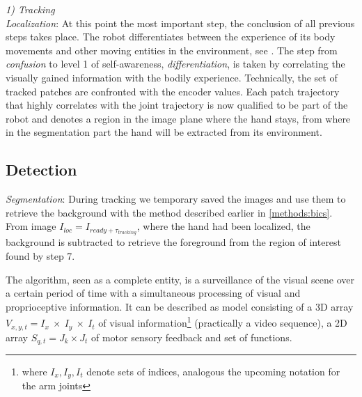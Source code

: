 	
	
%
\textit{1) Tracking}\\ \newline
\textit{Localization}: At this point the most important step, the conclusion of all previous steps takes place. The 						robot differentiates between the experience of its body movements and other moving entities in the environment, see 				\cite{FLSAUEL03-02}. The step from \textit{confusion} to level 1 of self-awareness, \textit{differentiation}, is 							taken by correlating the visually gained information with the bodily experience. Technically, the set of tracked  						patches are confronted with the encoder values. Each patch trajectory that highly correlates with the joint 									trajectory is now qualified to be part of the robot and denotes a region in the image plane where the hand stays, from where in the segmentation part the hand will be extracted from its environment.
\\ \newline
%
%
%
%
\subsection{Detection}\label{method:detection}
\textit{Segmentation}: During tracking we temporary saved the images and use them to retrieve the background with the method described earlier in \ref{methods:bics}. From image $I_{loc}=I_{ready + \tau_{tracking}}$, where the hand had been localized, the background  is subtracted to retrieve the foreground from the region of interest found by step 7.

%
The algorithm, seen as a complete entity, is a surveillance of the visual scene over a certain period of time with a simultaneous processing of visual and proprioceptive information. It can be described as model consisting of a 3D array $V_{x,y,t}=I_x\ \times\ I_y\ \times\ I_t$ of visual information\footnote{where $I_x,I_y,I_t$ denote sets of indices, analogous the upcoming notation for the arm joints} (practically a video sequence), a 2D array $S_{q,t} = J_k \times J_t$ of motor sensory feedback and set of functions. 

